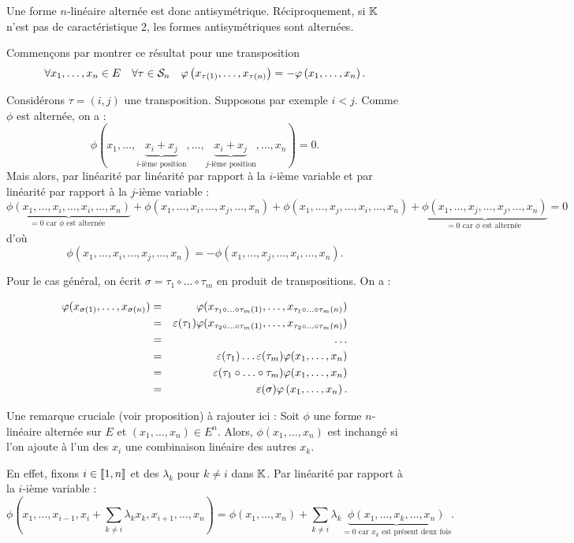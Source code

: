 \documentclass{magnolia}
\begin{document}
\begin{remarqueUnique}
\remarque Une forme $n$-linéaire alternée est donc antisymétrique. Réciproquement, si $\mathbb{K}$ n'est pas de
  caractéristique 2, les formes antisymétriques sont alternées.
\end{remarqueUnique}
  
\begin{preuve}
Commençons par montrer ce résultat pour une transposition
$$\forall x_1,\ldots,x_n\in E \quad \forall \tau\in\mathcal{S}_{n} \quad
  \varphi\left(x_{\tau\left(1\right)},\ldots,x_{\tau(n)}\right)=-
  \varphi\left(x_1,\ldots,x_n\right).$$
  
Considérons $\tau=(i,j)$ une transposition. Supposons par exemple $i<j$.
Comme $\phi$ est alternée, on a :
$$\phi(x_1,\ldots,\underbrace{x_i+x_j}_{i\text{-ième position}},\ldots,\underbrace{x_i+x_j}_{j\text{-ième position}},\ldots,x_n)=0.$$
Mais alors, par linéarité par linéarité par rapport à la $i$-ième variable et par linéarité par rapport à la $j$-ième variable :
$$\underbrace{\phi(x_1,\ldots,x_i,\ldots,x_i,\ldots,x_n)}_{=0 \text{ car } \phi \text{ est alternée }}+\phi(x_1,\ldots,x_i,\ldots,x_j,\ldots,x_n)+\phi(x_1,\ldots,x_j,\ldots,x_i,\ldots,x_n)+\underbrace{\phi(x_1,\ldots,x_j,\ldots,x_j,\ldots,x_n)}_{=0 \text{ car } \phi \text{ est alternée }}=0$$ d'où
$$\phi(x_1,\ldots,x_i,\ldots,x_j,\ldots,x_n)=-\phi(x_1,\ldots,x_j,\ldots,x_i,\ldots,x_n).$$

Pour le cas général, on écrit $\sigma=\tau_1\circ \ldots \circ \tau_m$ en produit de transpositions. On a :

\begin{eqnarray*}
\phi(x_{\sigma(1)},\ldots,x_{\sigma(n)})&=&\phi(x_{\tau_1\circ \ldots \circ \tau_m(1)},\ldots,x_{\tau_1\circ \ldots \circ \tau_m(n)})\\
&=& \epsilon(\tau_1)\phi(x_{\tau_2\circ \ldots \circ \tau_m(1)},\ldots,x_{\tau_2\circ \ldots \circ \tau_m(n)})\\
&=&\ldots \\
&=&\epsilon(\tau_1)\ldots\epsilon(\tau_m)\phi(x_1,\ldots,x_n)\\
&=&\epsilon(\tau_1\circ \ldots \circ \tau_m)\phi(x_1,\ldots,x_n)\\
&=&\signat{\sigma}
  \phi\p{x_1,\ldots,x_n}.
  \end{eqnarray*}



\end{preuve}

\begin{sol}
Une remarque cruciale (voir proposition) à rajouter ici :
Soit $\phi$ une forme $n$-linéaire alternée sur $E$ et $(x_1,\ldots,x_n)\in E^n$. Alors, $\phi(x_1,\ldots,x_n)$ est inchangé si l'on ajoute à l'un des $x_i$ une combinaison linéaire des autres $x_k$.

En effet, fixons $i \in \left\llbracket 1,n\right\rrbracket$ et des $\lambda_k$ pour $k\neq i$ dans $\mathbb{K}$. Par linéarité par rapport à la $i$-ième variable :
$$\phi(x_1,\ldots,x_{i-1},x_i+\sum_{k\neq i}\lambda_k x_k,x_{i+1},\ldots,x_n)=\phi(x_1,\ldots,x_n)+\sum_{k\neq i}\lambda_k \underbrace{\phi(x_1,\ldots,x_k,\ldots,x_n)}_{=0 \text{ car } x_k \text{ est présent deux fois}}.$$
\end{sol}
\end{document}
